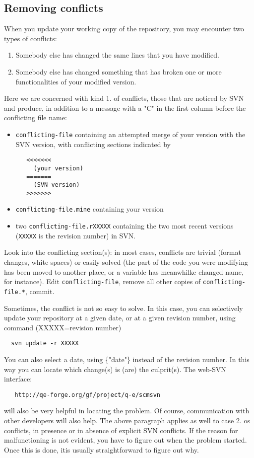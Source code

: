 \documentclass[12pt,a4paper]{article}
\begin{document}
\subsection{Removing conflicts}
\label{SubSec:Conflicts}
When you update your working copy of the repository, 
you may encounter two types of conflicts:
\begin{enumerate}
\item Somebody else has changed the same lines that you have
      modified. 
\item Somebody else has changed something that has broken one
      or more functionalities of your modified version.
\end{enumerate}
Here we are concerned with kind 1. of conflicts, those that
are noticed by SVN and produce, in addition to a message with
a "C" in the first column before the conflicting file name:
\begin{itemize}
\item \texttt{conflicting-file} containing an attempted merge
of your version with the SVN version, with conflicting sections
indicated by
\begin{verbatim}
   <<<<<<<
     (your version)
   =======
     (SVN version)
   >>>>>>> 
\end{verbatim}
\item \texttt{conflicting-file.mine} containing your version
\item two \texttt{conflicting-file.rXXXXX} containing the two most
recent versions (\texttt{XXXXX} is the revision number) in SVN.
\end{itemize}
Look into the conflicting section(s): in most cases, conflicts are trivial 
(format changes, white spaces) or easily solved (the part of the code you 
were modifying has been moved to another place, or a variable has meanwhilke
changed name, for instance). Edit \texttt{conflicting-file}, remove all other
copies of \texttt{conflicting-file.*}, commit.

Sometimes, the conflict is not so easy to solve. In this case, you
can selectively update your repository at a given date, or at a given
revision number, using command (XXXXX=revision number)
\begin{verbatim}
  svn update -r XXXXX
\end{verbatim}
You can also select a date, using \{"date"\} instead of the revision number.
In this way you can locate which change(s) is (are) the culprit(s).
The web-SVN interface:
\begin{verbatim}
   http://qe-forge.org/gf/project/q-e/scmsvn
\end{verbatim}
will also be very helpful in locating the problem.
Of course, communication with other developers will also help.
The above paragraph applies as well to case 2. os conflicts, in
presence or in absence of explicit SVN conflicts. If the reason for
malfunctioning is not evident, you have to figure out when the
problem started. Once this is done, itis usually straightforward
to figure out why.
\end{document}
